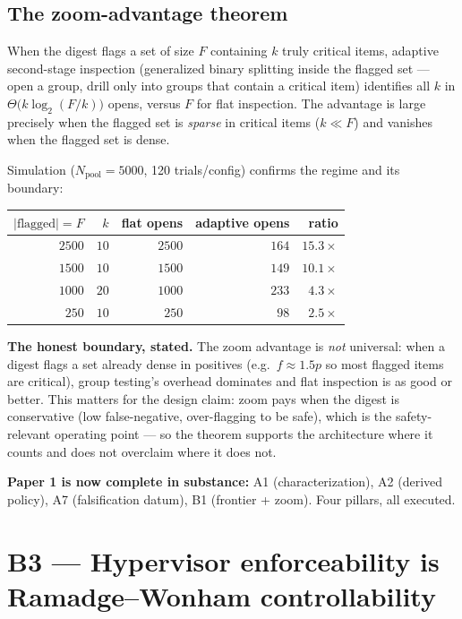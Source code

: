 \documentclass[11pt,a4paper]{article}
\begin{document}
\subsection{The zoom-advantage theorem}
\begin{theorem}
When the digest flags a set of size $F$ containing $k$ truly critical items, adaptive second-stage inspection (generalized binary splitting inside the flagged set --- open a group, drill only into groups that contain a critical item) identifies all $k$ in $\Theta\!\bigl(k\log_2(F/k)\bigr)$ opens, versus $F$ for flat inspection. The advantage is large precisely when the flagged set is \emph{sparse} in critical items ($k\ll F$) and vanishes when the flagged set is dense.
\end{theorem}
Simulation ($N_{\text{pool}}=5000$, 120 trials/config) confirms the regime and its boundary:
\begin{center}
\begin{tabular}{@{}rrrrr@{}}
\toprule
$|{\text{flagged}}|=F$ & $k$ & flat opens & adaptive opens & ratio \\
\midrule
$2500$ & $10$ & $2500$ & $164$ & $15.3\times$ \\
$1500$ & $10$ & $1500$ & $149$ & $10.1\times$ \\
$1000$ & $20$ & $1000$ & $233$ & $4.3\times$ \\
$250$ & $10$ & $250$ & $98$ & $2.5\times$ \\
\bottomrule
\end{tabular}
\end{center}


\noindent\textbf{The honest boundary, stated.} The zoom advantage is \emph{not} universal: when a digest flags a set already dense in positives (e.g.\ $f\approx1.5p$ so most flagged items are critical), group testing's overhead dominates and flat inspection is as good or better. This matters for the design claim: zoom pays when the digest is conservative (low false-negative, over-flagging to be safe), which is the safety-relevant operating point --- so the theorem supports the architecture where it counts and does not overclaim where it does not.

\noindent\textbf{Paper 1 is now complete in substance:} A1 (characterization), A2 (derived policy), A7 (falsification datum), B1 (frontier + zoom). Four pillars, all executed.

\section{B3 --- Hypervisor enforceability is Ramadge--Wonham controllability}
\end{document}
